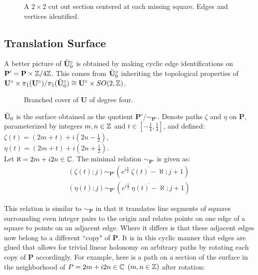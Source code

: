 \documentclass[]{article}
\def\btUos{\btU_0^\circ}
\begin{document}
\begin{figure}[H]
\centering

\caption{A $2\times2$ cut out section centered at each missing square. Edges and vertices identified.}
\label{fig:quotient}
\end{figure}

\subsection{Translation Surface}

A better picture of $\btUos$ is obtained by making cyclic edge identifications on $\mathbf{P'}=\mathbf{P}\times\mathbb{Z}/4\mathbb{Z}$. This comes from $\btUos$ inheriting the topological properties of $\bUs\times \pi_1(\bUs)/\pi_1(\btUos)\cong \bUs\times SO(2,\ZZ)$.


\begin{figure}[H]
\centering

\label{fig:utilda0}
\caption{Branched cover of $\mathbf{U}$ of degree four.}
\end{figure}

\begin{Def}
$\tilde{\mathbf{U}}_0$ is the surface obtained as the quotient $\mathbf{P}'/\sim_{\mathbf{P}'}$. Denote paths $\zeta$ and $\eta$  on $\mathbf{P}$, parameterized by integers $m,n\in\mathbb{Z}$ and $t\in[-\frac{1}{4},\frac{1}{4}]$, and defined:\\ $\zeta(t)=(2m+t)+i(2n-\frac{1}{2})$,\\
$\eta(t)=(2m+t)+i(2n+\frac{1}{2})$.\\ Let $\aleph=2m+i2n\in\mathbb{C}$. The minimal relation $\sim_{\mathbf{P}'}$ is given as:
\begin{equation}
\begin{split}
(\zeta(t);j)\sim_{\mathbf{P'}}(e^{i\frac{\pi}{2}}~\overline{\zeta(t)-\aleph};j+1)\\
(\eta(t);j)\sim_{\mathbf{P'}}(e^{i\frac{\pi}{2}}~\overline{\eta(t)-\aleph};j+1)
\label{eq:rel2}
\end{split}
\end{equation}
\end{Def}
This relation is similar to $\sim_\mathbf{P}$ in that it translates line segments of squares surrounding even integer pairs to the origin and relates points on one edge of a square to points on an adjacent edge. Where it differs is that these adjacent edges now belong to a different ``copy" of $\mathbf{P}$. It is in this cyclic manner that edges are glued that allows for trivial linear holonomy on arbitrary paths by rotating each copy of $\mathbf{P}$ accordingly. For example, here is a path on a section of the surface in the neighborhood of $P=2m+i2n\in\mathbb{C}$ $(m,n\in\mathbb{Z})$ after rotation:
\end{document}
